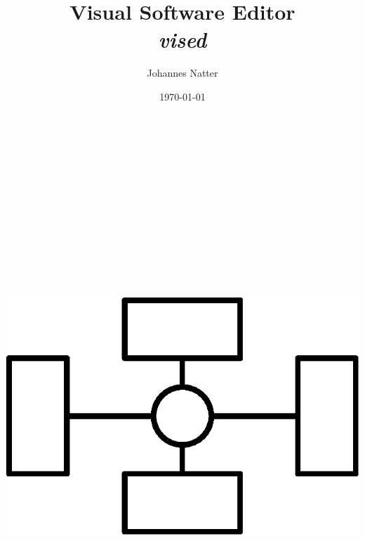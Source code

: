 \documentclass[a4paper,11pt,oneside]{book}
\begin{document}
    \title{\textbf{Visual Software Editor \\ \textit{vised}}} 
    \author{Johannes Natter}
    \date{\today \\ \ \\ \ \\ \ \\ \ \\ \ \\ \ \\ \ \\ \ \\ \ \\ \ \\ \ \\ \ \\ \ \\ \ \\ \includegraphics[width=100 pt]{../_common/logo}}

    \frontmatter
    \maketitle
    
    \tableofcontents
    

    \mainmatter
    

    \clearpage

    \backmatter
    

    \printbibliography
\end{document}

